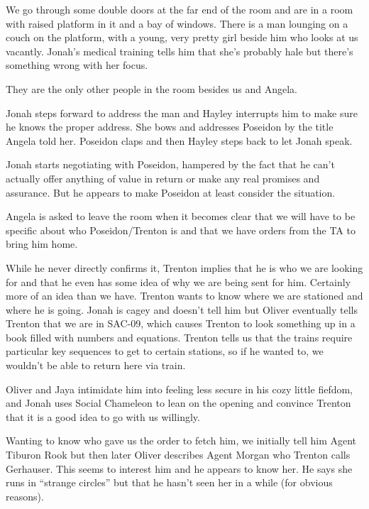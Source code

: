 We go through some double doors at the far end of the room and are in a room with raised platform in it and a bay of windows.  There is a man lounging on a couch on the platform, with a young, very pretty girl beside him who looks at us vacantly.  Jonah's medical training tells him that she's probably hale but there's something wrong with her focus.



They are the only other people in the room besides us and Angela.



Jonah steps forward to address the man and Hayley interrupts him to make sure he knows the proper address.  She bows and addresses Poseidon by the title Angela told her.  Poseidon claps and then Hayley steps back to let Jonah speak.



Jonah starts negotiating with Poseidon, hampered by the fact that he can't actually offer anything of value in return or make any real promises and assurance.  But he appears to make Poseidon at least consider the situation.  



Angela is asked to leave the room when it becomes clear that we will have to be specific about who Poseidon/Trenton is and that we have orders from the TA to bring him home.



While he never directly confirms it, Trenton implies that he is who we are looking for and that he even has some idea of why we are being sent for him.  Certainly more of an idea than we have.  Trenton wants to know where we are stationed and where he is going.  Jonah is cagey and doesn't tell him but Oliver eventually tells Trenton that we are in SAC-09, which causes Trenton to look something up in a book filled with numbers and equations.  Trenton tells us that the trains require particular key sequences to get to certain stations, so if he wanted to, we wouldn't be able to return here via train.



Oliver and Jaya intimidate him into feeling less secure in his cozy little fiefdom, and Jonah uses Social Chameleon to lean on the opening and convince Trenton that it is a good idea to go with us willingly.



Wanting to know who gave us the order to fetch him, we initially tell him Agent Tiburon Rook but then later Oliver describes Agent Morgan who Trenton calls Gerhauser.  This seems to interest him and he appears to know her.  He says she runs in ``strange circles'' but that he hasn't seen her in a while (for obvious reasons).



